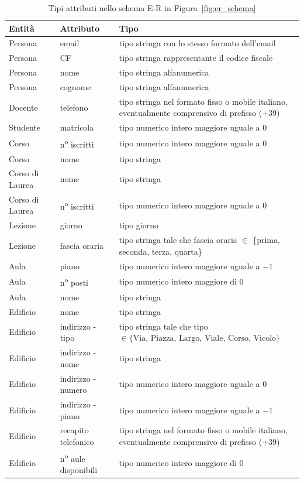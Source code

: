 \documentclass[a4paper,11pt]{article}
\begin{document}
\begin{table}[H]
\centering
\begin{tabularx}{\textwidth}{l l X}
\toprule
\textbf{Entità} & \textbf{Attributo} & \textbf{Tipo} \\
\midrule
Persona & email & tipo stringa con lo stesso formato dell'email \\
Persona & CF & tipo stringa rappresentante il codice fiscale \\
Persona & nome & tipo stringa alfanumerica \\
Persona & cognome & tipo stringa alfanumerica \\
Docente & telefono & tipo stringa nel formato fisso o mobile italiano, eventualmente comprensivo di prefisso (+39) \\
Studente & matricola & tipo numerico intero maggiore uguale a $0$ \\
Corso & n\textsuperscript{o} iscritti & tipo numerico intero maggiore uguale a $0$ \\
Corso & nome & tipo stringa \\
Corso di Laurea & nome & tipo stringa \\
Corso di Laurea & n\textsuperscript{o} iscritti & tipo numerico intero maggiore uguale a $0$ \\
Lezione & giorno & tipo giorno \\
Lezione & fascia oraria & tipo stringa tale che fascia oraria $\in$ \{prima, seconda, terza, quarta\} \\
Aula & piano & tipo numerico intero maggiore uguale a $-1$ \\
Aula & n\textsuperscript{o} posti & tipo numerico intero maggiore di $0$ \\
Aula & nome & tipo stringa \\
Edificio & nome & tipo stringa \\
Edificio & indirizzo - tipo & tipo stringa tale che tipo $\in \{\text{Via, Piazza, Largo, Viale, Corso, Vicolo}\}$ \\
Edificio & indirizzo - nome & tipo stringa \\
Edificio & indirizzo - numero & tipo numerico intero maggiore uguale a $0$ \\
Edificio & indirizzo - piano & tipo numerico intero maggiore uguale a $-1$ \\
Edificio & recapito telefonico & tipo stringa nel formato fisso o mobile italiano, eventualmente comprensivo di prefisso (+39) \\
Edificio & n\textsuperscript{o} aule disponibili & tipo numerico intero maggiore di $0$ \\

\bottomrule
\end{tabularx}
\caption{Tipi attributi nello schema E-R in Figura~\ref{fig:er_schema}}
\label{tab:attributes_er_schema}
\end{table}
\end{document}
